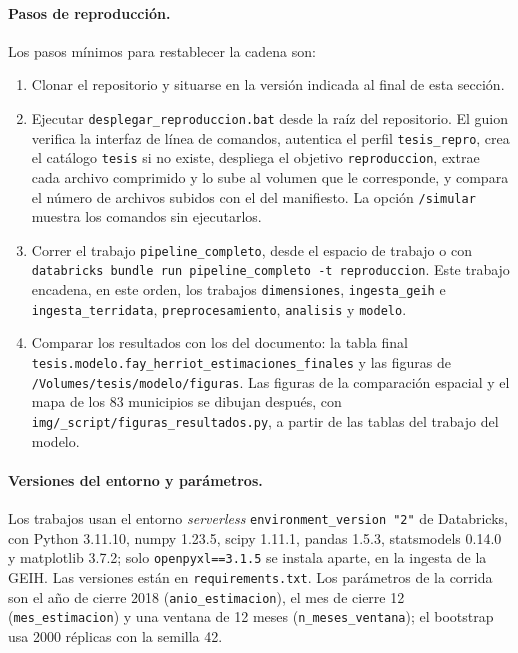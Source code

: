 \paragraph{Pasos de reproducción.} Los pasos mínimos para restablecer la cadena son:
\begin{enumerate}[nosep]
    \item Clonar el repositorio y situarse en la versión indicada al final de esta sección.
    \item Ejecutar \texttt{desplegar\_reproduccion.bat} desde la raíz del repositorio. El guion verifica la interfaz de línea de comandos, autentica el perfil \texttt{tesis\_repro}, crea el catálogo \texttt{tesis} si no existe, despliega el objetivo \texttt{reproduccion}, extrae cada archivo comprimido y lo sube al volumen que le corresponde, y compara el número de archivos subidos con el del manifiesto. La opción \texttt{/simular} muestra los comandos sin ejecutarlos.
    \item Correr el trabajo \texttt{pipeline\_completo}, desde el espacio de trabajo o con \texttt{databricks bundle run pipeline\_completo -t reproduccion}. Este trabajo encadena, en este orden, los trabajos \texttt{dimensiones}, \texttt{ingesta\_geih} e \texttt{ingesta\_terridata}, \texttt{preprocesamiento}, \texttt{analisis} y \texttt{modelo}.
    \item Comparar los resultados con los del documento: la tabla final \texttt{tesis.modelo.fay\_herriot\_estimaciones\_finales} y las figuras de \texttt{/Volumes/tesis/modelo/figuras}. Las figuras de la comparación espacial y el mapa de los 83 municipios se dibujan después, con \texttt{img/\_script/figuras\_resultados.py}, a partir de las tablas del trabajo del modelo.
\end{enumerate}

\paragraph{Versiones del entorno y parámetros.} Los trabajos usan el entorno \textit{serverless} \texttt{environment\_version "2"} de Databricks, con Python 3.11.10, numpy 1.23.5, scipy 1.11.1, pandas 1.5.3, statsmodels 0.14.0 y matplotlib 3.7.2; solo \texttt{openpyxl==3.1.5} se instala aparte, en la ingesta de la GEIH. Las versiones están en \texttt{requirements.txt}. Los parámetros de la corrida son el año de cierre 2018 (\texttt{anio\_estimacion}), el mes de cierre 12 (\texttt{mes\_estimacion}) y una ventana de 12 meses (\texttt{n\_meses\_ventana}); el bootstrap usa \num{2000} réplicas con la semilla 42.

